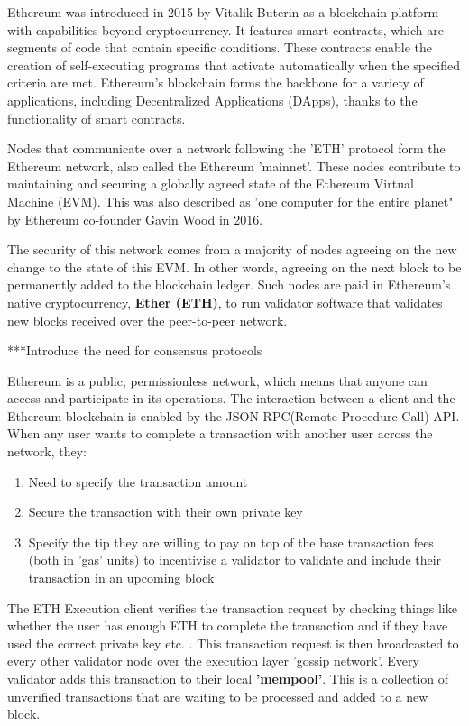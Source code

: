 Ethereum was introduced in 2015 by Vitalik Buterin as a blockchain platform with capabilities beyond cryptocurrency. It features smart contracts, which are segments of code that contain specific conditions. These contracts enable the creation of self-executing programs that activate automatically when the specified criteria are met. Ethereum's blockchain forms the backbone for a variety of applications, including Decentralized Applications (DApps), thanks to the functionality of smart contracts.

Nodes that communicate over a network following the 'ETH' protocol form the Ethereum network, also called the Ethereum 'mainnet'. These nodes contribute to maintaining and securing a globally agreed state of the Ethereum Virtual Machine (EVM). This was also described as 'one computer for the entire planet" by Ethereum co-founder Gavin Wood in 2016\cite{Ethereum:Industries}. 

The security of this network comes from a majority of nodes agreeing on the new change to the state of this EVM. In other words, agreeing on the next block to be permanently added to the blockchain ledger. Such nodes are paid in Ethereum's native cryptocurrency, \textbf{Ether (ETH)}, to run validator software that validates new blocks received over the peer-to-peer network.

***Introduce the need for consensus protocols

Ethereum is a public, permissionless network, which means that anyone can access and participate in its operations. The interaction between a client and the Ethereum blockchain is enabled by the JSON RPC(Remote Procedure Call) API. When any user wants to complete a transaction with another user across the network, they:
\begin{enumerate}
    \item Need to specify the transaction amount
    \item Secure the transaction with their own private key
    \item Specify the tip they are willing to pay on top of the base transaction fees (both in 'gas' units) to incentivise a validator to validate and include their transaction in an upcoming block
\end{enumerate}

The ETH Execution client verifies the transaction request by checking things like whether the user has enough ETH to complete the transaction and if they have used the correct private key etc. \cite{EthereumEthereum.org}. 
This transaction request is then broadcasted to every other validator node over the execution layer 'gossip network'. Every validator adds this transaction to their local \textbf{'mempool'}. This is a collection of unverified transactions that are waiting to be processed and added to a new block.

